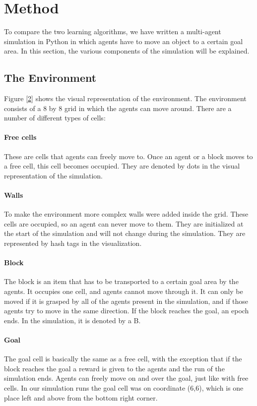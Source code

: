 \section{Method}
To compare the two learning algorithms, we have written a multi-agent simulation in Python in which agents have to move an object to a certain goal area. In this section, the various components of the simulation will be explained.
\subsection{The Environment}
Figure \ref{2} shows the visual representation of the environment. The environment consists of a 8 by 8 grid in which the agents can move around. There are a number of different types of cells:
\paragraph{Free cells}
These are cells that agents can freely move to. Once an agent or a block moves to a free cell, this cell becomes occupied. They are denoted by dots in the visual representation of the simulation.
\paragraph{Walls}
To make the environment more complex walls were added inside the grid. These cells are occupied, so an agent can never move to them. They are initialized at the start of the simulation and will not change during the simulation. They are represented by hash tags in the visualization.
\paragraph{Block}
The block is an item that has to be transported to a certain goal area by the agents. It occupies one cell, and agents cannot move through it. It can only be moved if it is grasped by all of the agents present in the simulation, and if those agents try to move in the same direction. If the block reaches the goal, an epoch ends. In the simulation, it is denoted by a B.
\paragraph{Goal}
The goal cell is basically the same as a free cell, with the exception that if the block reaches the goal a reward is given to the agents and the run of the simulation ends. Agents can freely move on and over the goal, just like with free cells. In our simulation runs the goal cell was on coordinate (6,6), which is one place left and above from the bottom right corner.
